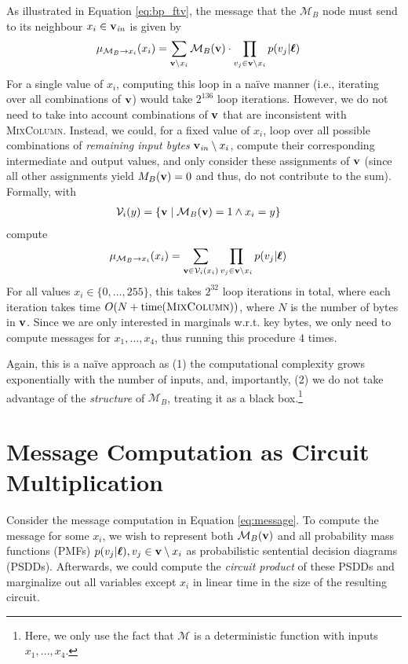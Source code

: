 As illustrated in Equation \ref{eq:bp_ftv}, the message that the $\mathcal{M}_B$ node must send to its neighbour $x_i \in \mathbf{v}_{\mathit{in}}$ is given by
\begin{align}
\label{eq:message}
    \mu_{\mathcal{M}_B \to x_i}(x_i) &= \sum_{\mathbf{v} \setminus x_i} \mathcal{M}_B(\mathbf{v}) \cdot \prod_{v_j \in \mathbf{v} \setminus x_i} p(v_j | \boldsymbol{\ell})
\end{align}
For a single value of $x_i$, computing this loop in a na\"ive manner (i.e., iterating over all combinations of $\mathbf{v}$) would take $2^{136}$ loop iterations. However, we do not need to take into account combinations of $\mathbf{v}$ that are inconsistent with \textsc{MixColumn}. Instead, we could, for a fixed value of $x_i$, loop over all possible combinations of \textit{remaining input bytes} $\mathbf{v}_{\mathit{in}} \setminus x_i$, compute their corresponding intermediate and output values, and only consider these assignments of $\mathbf{v}$ (since all other assignments yield $M_B(\mathbf{v}) = 0$ and thus, do not contribute to the sum). Formally, with 
\begin{align}
    \mathcal{V}_i(y) &= \{ \mathbf{v} \mid \mathcal{M}_B(\mathbf{v}) = 1 \land x_i = y \}
\end{align}
compute
\begin{align}
    \label{eq:loop}
    \mu_{\mathcal{M}_B \to x_i}(x_i) &= \sum_{\mathbf{v} \in \mathcal{V}_i(x_i)} \prod_{v_j \in \mathbf{v} \setminus x_i} p(v_j | \boldsymbol{\ell})
\end{align}
For all values $x_i \in \{0,\dots,255\}$, this takes $2^{32}$ loop iterations in total, where each iteration takes time $O(N + \operatorname{time}(\textsc{MixColumn}))$, where $N$ is the number of bytes in $\mathbf{v}$. Since we are only interested in marginals w.r.t. key bytes, we only need to compute messages for $x_1,\dots,x_4$, thus running this procedure $4$ times. 

Again, this is a na\"ive approach as (1) the computational complexity grows exponentially with the number of inputs, and, importantly, (2) we do not take advantage of the \textit{structure} of $\mathcal{M}_B$, treating it as a black box.\footnote{Here, we only use the fact that $\mathcal{M}$ is a deterministic function with inputs $x_1,\dots,x_4$.}

\section{Message Computation as Circuit Multiplication}
Consider the message computation in Equation \ref{eq:message}. To compute the message for some $x_i$, we wish to represent both $\mathcal{M}_B(\mathbf{v})$ and all probability mass functions (PMFs) $p(v_j | \boldsymbol{\ell}), v_j \in \mathbf{v} \setminus x_i$ as probabilistic sentential decision diagrams (PSDDs). Afterwards, we could compute the \textit{circuit product} of these PSDDs and marginalize out all variables except $x_i$ in linear time in the size of the resulting circuit.

